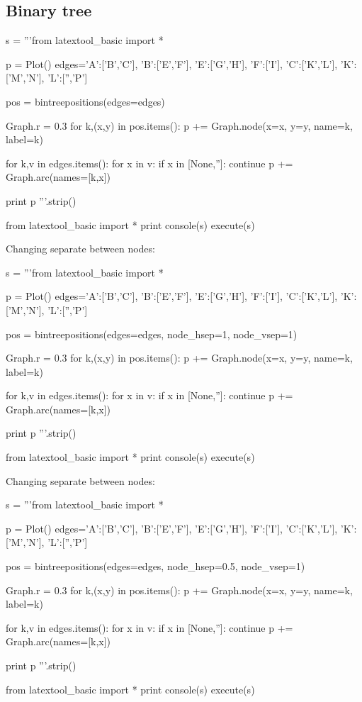 \subsection{Binary tree}

\begin{python}
s = '''from latextool_basic import *

p = Plot()
edges={'A':['B','C'],
       'B':['E','F'],
       'E':['G','H'],
       'F':['I'],
       'C':['K','L'],
       'K':['M','N'],
       'L':['','P']}
     
pos = bintreepositions(edges=edges)

Graph.r = 0.3
for k,(x,y) in pos.items():
    p += Graph.node(x=x, y=y, name=k, label=k)

for k,v in edges.items():
    for x in v:
        if x in [None,'']: continue
        p += Graph.arc(names=[k,x])

print p
'''.strip()

from latextool_basic import *
print console(s)
execute(s)
\end{python}





\newpage
Changing separate between nodes:
\begin{python}
s = '''from latextool_basic import *

p = Plot()
edges={'A':['B','C'],
       'B':['E','F'],
       'E':['G','H'],
       'F':['I'],
       'C':['K','L'],
       'K':['M','N'],
       'L':['','P']}
     
pos = bintreepositions(edges=edges, node_hsep=1, node_vsep=1)

Graph.r = 0.3
for k,(x,y) in pos.items():
    p += Graph.node(x=x, y=y, name=k, label=k)

for k,v in edges.items():
    for x in v:
        if x in [None,'']: continue
        p += Graph.arc(names=[k,x])

print p
'''.strip()

from latextool_basic import *
print console(s)
execute(s)
\end{python}




\newpage
Changing separate between nodes:
\begin{python}
s = '''from latextool_basic import *

p = Plot()
edges={'A':['B','C'],
       'B':['E','F'],
       'E':['G','H'],
       'F':['I'],
       'C':['K','L'],
       'K':['M','N'],
       'L':['','P']}
     
pos = bintreepositions(edges=edges, node_hsep=0.5, node_vsep=1)

Graph.r = 0.3
for k,(x,y) in pos.items():
    p += Graph.node(x=x, y=y, name=k, label=k)

for k,v in edges.items():
    for x in v:
        if x in [None,'']: continue
        p += Graph.arc(names=[k,x])

print p
'''.strip()

from latextool_basic import *
print console(s)
execute(s)
\end{python}



